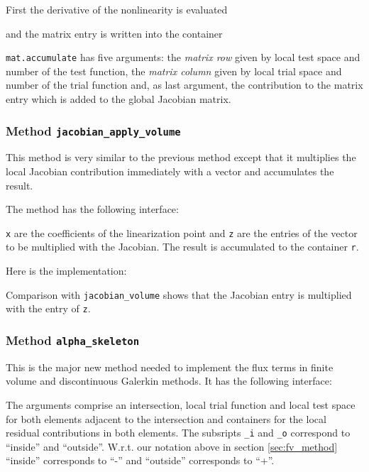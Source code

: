 \documentclass[a4paper,12pt]{article}
\begin{document}
First the derivative of the nonlinearity is evaluated

and the matrix entry is written into the container

\lstinline{mat.accumulate} has five arguments:
the \textit{matrix row} given by local test space and number of the
test function, the \textit{matrix column} given by local trial space and
number of the trial function and, as last argument, the contribution to
the matrix entry which is added to the global Jacobian matrix.

\subsubsection*{Method \lstinline{jacobian_apply_volume}}

This method is very similar to the previous method except that
it multiplies the local Jacobian contribution immediately with a vector
and accumulates the result.

The method has the following interface:

\lstinline{x} are the coefficients of the linearization point and
\lstinline{z} are the entries of the vector to be multiplied with the 
Jacobian. The result is accumulated to the container \lstinline{r}.

Here is the implementation:

Comparison with \lstinline{jacobian_volume} shows that
the Jacobian entry is multiplied with the entry of \lstinline{z}.

\subsubsection*{Method \lstinline{alpha_skeleton}}

This is the major new method needed to implement the flux terms
in finite volume and discontinuous Galerkin methods. It
has the following interface:

The arguments comprise an intersection, local trial function
and local test space for both elements adjacent to the intersection
and containers for the local residual contributions in both elements.
The subsripts \lstinline{_i} and \lstinline{_o} correspond to
``inside'' and ``outside''. W.r.t. our notation above in section \ref{sec:fv_method}
``inside'' corresponds to ``-'' and ``outside'' corresponds to ``+''.
\end{document}
